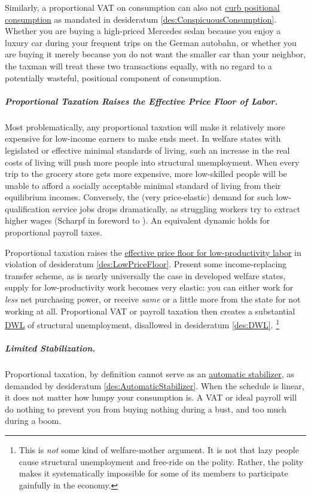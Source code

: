 Similarly, a proportional VAT on consumption can also not \hyperref[des:ConspicuousConsumption]{curb positional consumption} as mandated in desideratum \ref{des:ConspicuousConsumption}.
Whether you are buying a high-priced Mercedes sedan because you enjoy a luxury car during your frequent trips on the German autobahn, or whether you are buying it merely because you do not want the smaller car than your neighbor, the taxman will treat these two transactions equally, with no regard to a potentially wasteful, positional component of consumption.

\subparagraph{Proportional Taxation Raises the Effective Price Floor of Labor.}
	\label{sec:PropTaxDWL}
Most problematically, any proportional taxation will make it relatively more expensive for low-income earners to make ends meet.
In welfare states with legislated or effective minimal standards of living, such an increase in the real costs of living will push more people into structural unemployment.
When every trip to the grocery store gets more expensive, more low-skilled people will be unable to afford a socially acceptable minimal standard of living from their equilibrium incomes.
Conversely, the (very price-elastic) demand for such low-qualification service jobs drops dramatically, as struggling workers try to extract higher wages (Scharpf in foreword to \citealt[12ff]{Ganghof2004}).
An equivalent dynamic holds for proportional payroll taxes.

Proportional taxation raises the \hyperref[des:LowPriceFloor]{effective price floor for low-productivity labor} in violation of desideratum \ref{des:LowPriceFloor}.
Present some income-replacing transfer scheme, as is nearly universally the case in developed welfare states, supply for low-productivity work becomes very elastic:
you can either work for \emph{less} net purchasing power, or receive \emph{same} or a little more from the state for not working at all.
Proportional VAT or payroll taxation then creates a substantial \hyperref[des:DWL]{DWL} of structural unemployment, disallowed in desideratum \ref{des:DWL}.
\footnote{
	This is \emph{not} some kind of welfare-mother argument.
	It is not that lazy people cause structural unemployment and free-ride on the polity.
	Rather, the polity makes it systematically impossible for some of its members to participate gainfully in the economy.
}

\subparagraph{Limited Stabilization.}
Proportional taxation, by definition cannot serve as an \hyperref[des:AutomaticStabilizer]{automatic stabilizer}, as demanded by desideratum \ref{des:AutomaticStabilizer}.
When the schedule is linear, it does not matter how lumpy your consumption is.
A VAT or ideal payroll will do nothing to prevent you from buying nothing during a bust, and too much during a boom.

